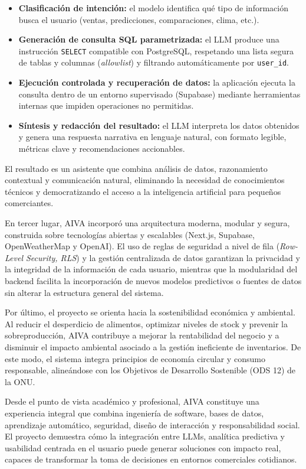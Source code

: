 \begin{itemize}
    \item \textbf{Clasificación de intención:} el modelo identifica qué tipo de información busca el usuario (ventas, predicciones, comparaciones, clima, etc.).
    \item \textbf{Generación de consulta SQL parametrizada:} el LLM produce una instrucción \texttt{SELECT} compatible con PostgreSQL, respetando una lista segura de tablas y columnas (\textit{allowlist}) y filtrando automáticamente por \texttt{user\_id}.
    \item \textbf{Ejecución controlada y recuperación de datos:} la aplicación ejecuta la consulta dentro de un entorno supervisado (Supabase) mediante herramientas internas que impiden operaciones no permitidas.
    \item \textbf{Síntesis y redacción del resultado:} el LLM interpreta los datos obtenidos y genera una respuesta narrativa en lenguaje natural, con formato legible, métricas clave y recomendaciones accionables.
\end{itemize}

El resultado es un asistente que combina análisis de datos, razonamiento contextual y comunicación natural, eliminando la necesidad de conocimientos técnicos y democratizando el acceso a la inteligencia artificial para pequeños comerciantes.

En tercer lugar, AIVA incorporó una arquitectura moderna, modular y segura, construida sobre tecnologías abiertas y escalables (Next.js, Supabase, OpenWeatherMap y OpenAI). 
El uso de reglas de seguridad a nivel de fila (\textit{Row-Level Security, RLS}) y la gestión centralizada de datos garantizan la privacidad y la integridad de la información de cada usuario, mientras que la modularidad del backend facilita la incorporación de nuevos modelos predictivos o fuentes de datos sin alterar la estructura general del sistema.

Por último, el proyecto se orienta hacia la sostenibilidad económica y ambiental. 
Al reducir el desperdicio de alimentos, optimizar niveles de stock y prevenir la sobreproducción, AIVA contribuye a mejorar la rentabilidad del negocio y a disminuir el impacto ambiental asociado a la gestión ineficiente de inventarios. 
De este modo, el sistema integra principios de economía circular y consumo responsable, alineándose con los Objetivos de Desarrollo Sostenible (ODS 12) de la ONU.

Desde el punto de vista académico y profesional, AIVA constituye una experiencia integral que combina ingeniería de software, bases de datos, aprendizaje automático, seguridad, diseño de interacción y responsabilidad social. 
El proyecto demuestra cómo la integración entre LLMs, analítica predictiva y usabilidad centrada en el usuario puede generar soluciones con impacto real, capaces de transformar la toma de decisiones en entornos comerciales cotidianos.

